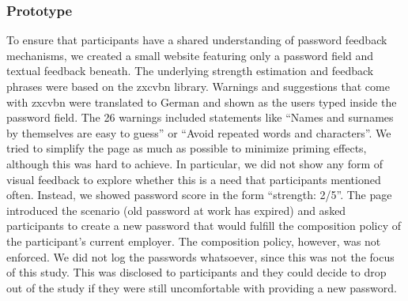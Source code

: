
\subsubsection{Prototype}
To ensure that participants have a shared understanding of password feedback mechanisms, we created a small website featuring only a password field and textual feedback beneath. The underlying strength estimation and feedback phrases were based on the zxcvbn library. Warnings and suggestions that come with zxcvbn were translated to German and shown as the users typed inside the password field. The 26 warnings included statements like ``Names and surnames by themselves are easy to guess'' or ``Avoid repeated words and characters''. We tried to simplify the page as much as possible to minimize priming effects, although this was hard to achieve. In particular, we did not show any form of visual feedback to explore whether this is a need that participants mentioned often. Instead, we showed password score in the form ``strength: 2/5''.  The page introduced the scenario (old password at work has expired) and asked participants to create a new password that would fulfill the composition policy of the participant's current employer. The composition policy, however, was not enforced. We did not log the passwords whatsoever, since this was not the focus of this study. This was disclosed to participants and they could decide to drop out of the study if they were still uncomfortable with providing a new password.  

